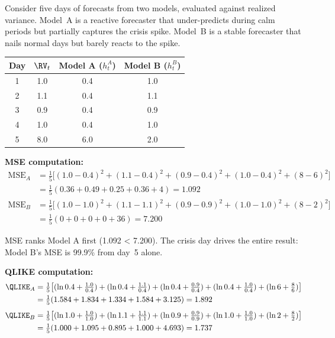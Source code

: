 \begin{workedexample}
Consider five days of forecasts from two models, evaluated against realized variance.
Model~A is a reactive forecaster that under-predicts during calm periods but partially captures the crisis spike.
Model~B is a stable forecaster that nails normal days but barely reacts to the spike.

\medskip
\begin{center}
\begin{tabular}{cccc}
\toprule
Day & $\RV_t$ & Model A ($h^A_t$) & Model B ($h^B_t$) \\
\midrule
1 & 1.0 & 0.4 & 1.0 \\
2 & 1.1 & 0.4 & 1.1 \\
3 & 0.9 & 0.4 & 0.9 \\
4 & 1.0 & 0.4 & 1.0 \\
5 & 8.0 & 6.0 & 2.0 \\
\bottomrule
\end{tabular}
\end{center}
\medskip

\textbf{MSE computation:}
\begin{align*}
\text{MSE}_A &= \tfrac{1}{5}\bigl[(1.0-0.4)^2 + (1.1-0.4)^2 + (0.9-0.4)^2 + (1.0-0.4)^2 + (8-6)^2\bigr] \\
  &= \tfrac{1}{5}(0.36 + 0.49 + 0.25 + 0.36 + 4) = 1.092 \\[4pt]
\text{MSE}_B &= \tfrac{1}{5}\bigl[(1.0-1.0)^2 + (1.1-1.1)^2 + (0.9-0.9)^2 + (1.0-1.0)^2 + (8-2)^2\bigr] \\
  &= \tfrac{1}{5}(0 + 0 + 0 + 0 + 36) = 7.200
\end{align*}

MSE ranks Model A first (1.092 < 7.200).
The crisis day drives the entire result: Model B's MSE is 99.9\% from day~5 alone.

\textbf{QLIKE computation:}
\begin{align*}
\QLIKE_A &= \tfrac{1}{5}\bigl[(\ln 0.4 + \tfrac{1.0}{0.4}) + (\ln 0.4 + \tfrac{1.1}{0.4}) + (\ln 0.4 + \tfrac{0.9}{0.4}) + (\ln 0.4 + \tfrac{1.0}{0.4}) + (\ln 6 + \tfrac{8}{6})\bigr] \\
  &= \tfrac{1}{5}(1.584 + 1.834 + 1.334 + 1.584 + 3.125) = 1.892 \\[4pt]
\QLIKE_B &= \tfrac{1}{5}\bigl[(\ln 1.0 + \tfrac{1.0}{1.0}) + (\ln 1.1 + \tfrac{1.1}{1.1}) + (\ln 0.9 + \tfrac{0.9}{0.9}) + (\ln 1.0 + \tfrac{1.0}{1.0}) + (\ln 2 + \tfrac{8}{2})\bigr] \\
  &= \tfrac{1}{5}(1.000 + 1.095 + 0.895 + 1.000 + 4.693) = 1.737
\end{align*}


\end{workedexample}
